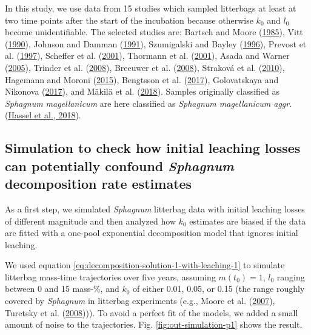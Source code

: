 \documentclass[
  12pt,
]{article}
\begin{document}
In this study, we use data from 15 studies which sampled litterbags at least at two time points after the start of the incubation because otherwise \(k_0\) and \(l_0\) become unidentifiable. The selected studies are: Bartsch and Moore (\protect\hyperlink{ref-Bartsch.1985}{1985}), Vitt (\protect\hyperlink{ref-Vitt.1990}{1990}), Johnson and Damman (\protect\hyperlink{ref-Johnson.1991}{1991}), Szumigalski and Bayley (\protect\hyperlink{ref-Szumigalski.1996}{1996}), Prevost et al. (\protect\hyperlink{ref-Prevost.1997}{1997}), Scheffer et al. (\protect\hyperlink{ref-Scheffer.2001}{2001}), Thormann et al. (\protect\hyperlink{ref-Thormann.2001}{2001}), Asada and Warner (\protect\hyperlink{ref-Asada.2005b}{2005}), Trinder et al. (\protect\hyperlink{ref-Trinder.2008}{2008}), Breeuwer et al. (\protect\hyperlink{ref-Breeuwer.2008}{2008}), Straková et al. (\protect\hyperlink{ref-Strakova.2010}{2010}), Hagemann and Moroni (\protect\hyperlink{ref-Hagemann.2015}{2015}), Bengtsson et al. (\protect\hyperlink{ref-Bengtsson.2017}{2017}), Golovatskaya and Nikonova (\protect\hyperlink{ref-Golovatskaya.2017}{2017}), and Mäkilä et al. (\protect\hyperlink{ref-Makila.2018}{2018}). Samples originally classified as \emph{Sphagnum magellanicum} are here classified as \emph{Sphagnum magellanicum aggr.} (\protect\hyperlink{ref-Hassel.2018}{Hassel et al., 2018}).

\hypertarget{simulation-to-check-how-initial-leaching-losses-can-potentially-confound-sphagnum-decomposition-rate-estimates}{%
\subsection{\texorpdfstring{Simulation to check how initial leaching losses can potentially confound \emph{Sphagnum} decomposition rate estimates}{Simulation to check how initial leaching losses can potentially confound Sphagnum decomposition rate estimates}}\label{simulation-to-check-how-initial-leaching-losses-can-potentially-confound-sphagnum-decomposition-rate-estimates}}

As a first step, we simulated \emph{Sphagnum} litterbag data with initial leaching losses of different magnitude and then analyzed how \(k_0\) estimates are biased if the data are fitted with a one-pool exponential decomposition model that ignores initial leaching.

We used equation \eqref{eq:decomposition-solution-1-with-leaching-1} to simulate litterbag mass-time trajectories over five years, assuming \(m(t_0)=1\), \(l_0\) ranging between 0 and 15 mass-\%, and \(k_0\) of either 0.01, 0.05, or 0.15 (the range roughly covered by \emph{Sphagnum} in litterbag experiments (e.g., Moore et al. (\protect\hyperlink{ref-Moore.2007}{2007}), Turetsky et al. (\protect\hyperlink{ref-Turetsky.2008}{2008}))). To avoid a perfect fit of the models, we added a small amount of noise to the trajectories. Fig. \ref{fig:out-simulation-p1} shows the result.
\end{document}
